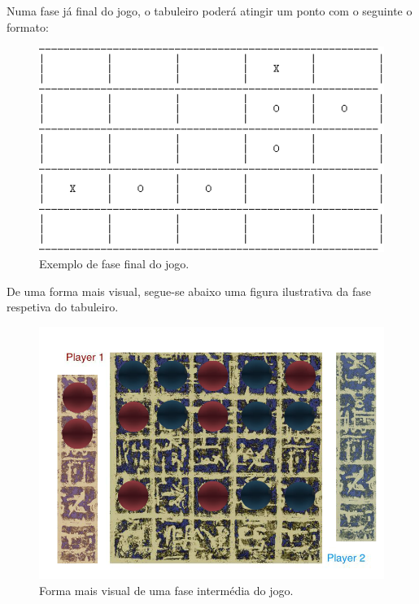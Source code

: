\documentclass[a4paper]{article}
\begin{document}
Numa fase já final do jogo, o tabuleiro poderá atingir um ponto com o seguinte o formato:

\begin{figure}[!htb]
	\centering
	\includegraphics[scale=0.6]{images/board_prolog.png}
	\caption{Exemplo de fase final do jogo.}
\end{figure}

De uma forma mais visual, segue-se abaixo uma figura ilustrativa da fase respetiva do tabuleiro.

\begin{figure}[!htb]
	\centering
	\includegraphics[scale=0.6]{images/board_inter.png}
	\caption{Forma mais visual de uma fase intermédia do jogo.}
\end{figure}

\newpage

\end{document}
